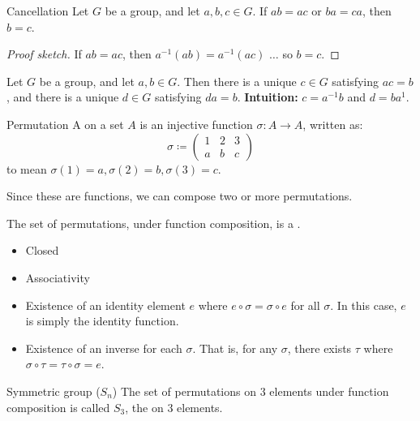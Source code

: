 \begin{thmbox}{Cancellation}{}
    Let $G$ be a group, and let $a,b,c \in G$. If $ab = ac$ or $ba = ca$, then $b = c$.
    \tcblower
    \begin{proof}[Proof sketch]
        If $ab = ac$, then $a^{-1}(ab) = a^{-1}(ac)$ $\ldots$ so $b = c$.
    \end{proof}
\end{thmbox}

\begin{thmbox}{}{}
    Let $G$ be a group, and let $a,b \in G$. Then there is a unique $c \in G$ satisfying $ac = b$, and there is a unique $d \in G$ satisfying $da = b$.
    \tcblower
    \textbf{Intuition:} $c = a^{-1}b$ and $d = ba^{1}$.
\end{thmbox}


\begin{dfnbox}{Permutation}{}
    A  on a set $A$ is an injective function $\sigma : A \to A$, written as:
    \[ \sigma \coloneq \begin{pmatrix} 1 & 2 & 3 \\ a & b & c \end{pmatrix} \]
    to mean $\sigma(1) = a, \sigma(2) = b, \sigma(3) = c$.
\end{dfnbox}

Since these are functions, we can compose two or more permutations.


The set of permutations, under function composition, is a .
\begin{itemize}[noitemsep]
    \item Closed
    \item Associativity
    \item Existence of an identity element $e$ where $e \circ \sigma = \sigma \circ e$ for all $\sigma$. In this case, $e$ is simply the identity function.
    \item Existence of an inverse for each $\sigma$. That is, for any $\sigma$, there exists $\tau$ where $\sigma \circ \tau = \tau \circ \sigma = e$.
\end{itemize}

\begin{dfnbox}{Symmetric group ($S_n$)}{}
    The set of permutations on $3$ elements under function composition is called $S_3$, the  on $3$ elements.
\end{dfnbox}

